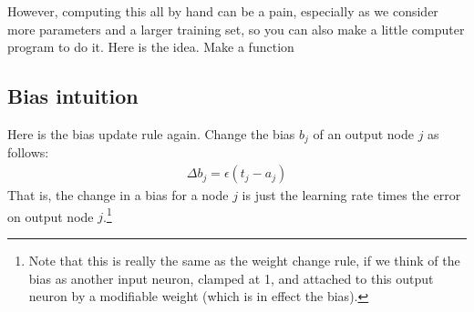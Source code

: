 However, computing this all by hand can be  a pain, especially as we consider more parameters and a larger training set, so you can also make a little computer program to do it.  Here is the idea. Make a function

%
%
%
%


\subsection{Bias intuition}

Here is the bias update rule again. Change the bias $b_j$ of an output node $j$ as follows: 
\begin{eqnarray*}
\Delta b_j  =  \epsilon (t_j - a_j)
\end{eqnarray*}
That is, the change in a bias for a node $j$ is just the learning rate times the error on output node $j$.\footnote{Note that this is really the same as the weight change rule, if we think of the bias as another input neuron, clamped at 1, and attached to this output neuron by a modifiable weight (which is in effect the bias).}

